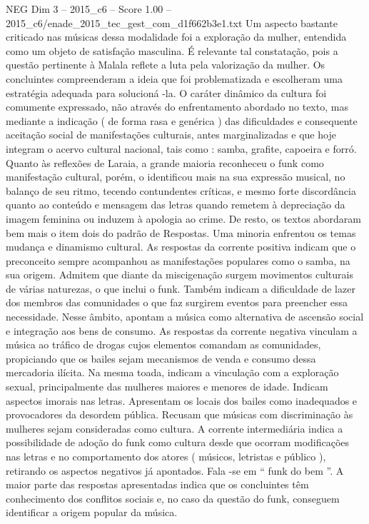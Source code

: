 \begin{textsample}{NEG Dim 3 – 2015\_c6 – Score 1.00 – 2015\_c6/enade\_2015\_tec\_gest\_com\_d1f662b3e1.txt}
Um aspecto bastante criticado nas músicas dessa modalidade foi a exploração da mulher, entendida como um objeto de satisfação masculina.
É relevante tal constatação, pois a questão pertinente à Malala reflete a luta pela valorização da mulher.
Os concluintes compreenderam a ideia que foi problematizada e escolheram uma estratégia adequada para solucioná -la.
O caráter dinâmico da cultura foi comumente expressado, não através do enfrentamento abordado no texto, mas mediante a indicação ( de forma rasa e genérica ) das dificuldades e consequente aceitação social de manifestações culturais, antes marginalizadas e que hoje integram o acervo cultural nacional, tais como : samba, grafite, capoeira e forró.
Quanto às reflexões de Laraia, a grande maioria reconheceu o funk como manifestação cultural, porém, o identificou mais na sua expressão musical, no balanço de seu ritmo, tecendo contundentes críticas, e mesmo forte discordância quanto ao conteúdo e mensagem das letras quando remetem à depreciação da imagem feminina ou induzem à apologia ao crime.
De resto, os textos abordaram bem mais o item dois do padrão de Respostas.
Uma minoria enfrentou os temas mudança e dinamismo cultural.
As respostas da corrente positiva indicam que o preconceito sempre acompanhou as manifestações populares como o samba, na sua origem.
Admitem que diante da miscigenação surgem movimentos culturais de várias naturezas, o que inclui o funk.
Também indicam a dificuldade de lazer dos membros das comunidades o que faz surgirem eventos para preencher essa necessidade.
Nesse âmbito, apontam a música como alternativa de ascensão social e integração aos bens de consumo.
As respostas da corrente negativa vinculam a música ao tráfico de drogas cujos elementos comandam as comunidades, propiciando que os bailes sejam mecanismos de venda e consumo dessa mercadoria ilícita.
Na mesma toada, indicam a vinculação com a exploração sexual, principalmente das mulheres maiores e menores de idade.
Indicam aspectos imorais nas letras.
Apresentam os locais dos bailes como inadequados e provocadores da desordem pública.
Recusam que músicas com discriminação às mulheres sejam consideradas como cultura.
A corrente intermediária indica a possibilidade de adoção do funk como cultura desde que ocorram modificações nas letras e no comportamento dos atores ( músicos, letristas e público ), retirando os aspectos negativos já apontados.
Fala -se em “ funk do bem ”.
A maior parte das respostas apresentadas indica que os concluintes têm conhecimento dos conflitos sociais e, no caso da questão do funk, conseguem identificar a origem popular da música.

\end{textsample}
